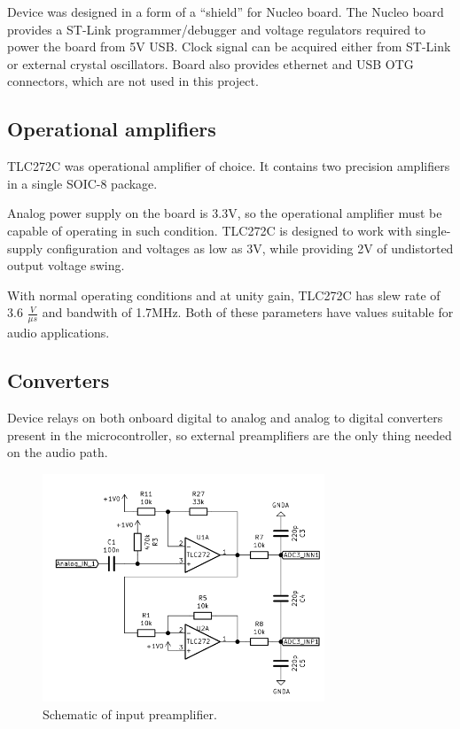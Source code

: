 \documentclass[a4paper,twoside,12pt]{book}
\begin{document}
Device was designed in a form of a “shield” for Nucleo board.
The Nucleo board provides a ST-Link programmer/debugger
and voltage regulators required to power the board from 5V USB.
Clock signal can be acquired either from ST-Link or
external crystal oscillators.
Board also provides ethernet and USB OTG connectors,
which are not used in this project.

\subsection {Operational amplifiers}
TLC272C was operational amplifier of choice\cite{TI:TLC272}.
It contains two precision amplifiers in a single SOIC-8 package.

Analog power supply on the board is 3.3V, so the operational amplifier
must be capable of operating in such condition.
TLC272C is designed to work with single-supply configuration
and voltages as low as 3V,
while providing 2V of undistorted output voltage swing.

With normal operating conditions and at unity gain,
TLC272C has slew rate of 3.6 \(\frac{V}{\mu s}\) and bandwith of 1.7MHz.
Both of these parameters have values suitable for audio applications.

\subsection{Converters}
Device relays on both onboard digital to analog
and analog to digital converters present in the microcontroller,
so external preamplifiers are the only thing needed on the audio path.

\begin{figure}[H]
    \centering
    \includegraphics[width=0.75\textwidth]{images/Input_preamp}
    \caption{Schematic of input preamplifier.}
    \label{fig:input}
\end{figure}
\end{document}

